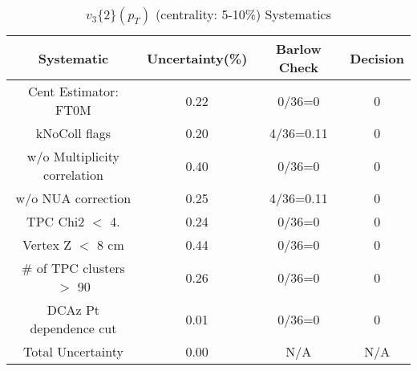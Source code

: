 \begin{table}[htbp]
\caption{$v_3\{2\}(p_{T})$ (centrality: 5-10\%) Systematics}
\label{tab:Sys_pTDiffv3}
\centering
\begin{tabular}{|c|c|c|c|}
\hline
Systematic & Uncertainty(\%) & Barlow Check & Decision \\
\hline
Cent Estimator: FT0M & 0.22 & 0/36=0 & 0 \\
kNoColl flags & 0.20 & 4/36=0.11 & 0 \\
w/o Multiplicity correlation & 0.40 & 0/36=0 & 0 \\
w/o NUA correction & 0.25 & 4/36=0.11 & 0 \\
TPC Chi2 $<$ 4. & 0.24 & 0/36=0 & 0 \\
Vertex Z $<$ 8 cm & 0.44 & 0/36=0 & 0 \\
\# of TPC clusters $>$ 90 & 0.26 & 0/36=0 & 0 \\
DCAz Pt dependence cut & 0.01 & 0/36=0 & 0 \\
\hline
Total Uncertainty & 0.00 & N/A & N/A \\
\hline
\end{tabular}
\end{table}
